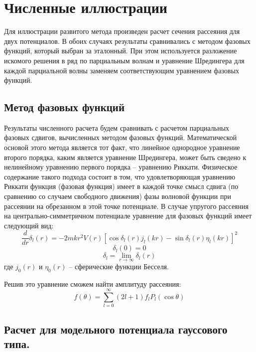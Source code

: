 \documentclass[a4paper,12pt]{article}
\begin{document}
\newline
\section{Численные иллюстрации}
Для иллюстрации развитого метода произведен расчет сечения рассеяния для двух потенциалов. В обоих случаях результаты сравнивались с методом фазовых функций, который выбран за эталонный. При этом используется разложение искомого решения в ряд по парциальным волнам и уравнение Шредингера для каждой парциальной волны заменяем соответствующим уравнением фазовых функций.

\newline
  \subsection{Метод фазовых функций}
  Результаты численного расчета будем сравнивать с расчетом парциальных фазовых сдвигов, вычисленных методом фазовых функций. Математической основой этого метода является тот факт, что линейное однородное уравнение второго порядка, каким является уравнение Шредингера, может быть сведено к нелинейному уравнению первого порядка -- уравнению Риккати. Физическое содержание такого подхода состоит в том, что удовлетворяющая уравнению Риккати функция (фазовая функция) имеет в каждой точке смысл сдвига (по сравнению со случаем свободного движения) фазы волновой функции при рассеянии на обрезанном в этой точке потенциале.\cite{babik} В случае упругого рассеяния на центрально-симметричном потенциале уравнение для фазовых функций имеет следующий вид:
  \[
    \frac{d}{d r}\delta_l(r) = - 2mkr^2V(r)[\cos\delta_l(r) j_l(kr) - \sin \delta_l(r)\eta_l(kr)]^{2}
  \]\[
    \delta_l(0) = 0
  \]\[
    \delta_l = \lim_{r \to \infty} \delta_l(r)
  \]
где $j_0(r)$ и $\eta_0(r)$ -- сферические функции Бесселя.

  Решив это уравнение сможем найти амплитуду рассеяния:
  \[
  f(\theta) = \sum\limits_{l=0}^\infty (2l+1) f_l P_l(\cos\theta)
  \]
  
  
	\subsection{Расчет для модельного потенциала гауссового типа.}
	
\end{document}
